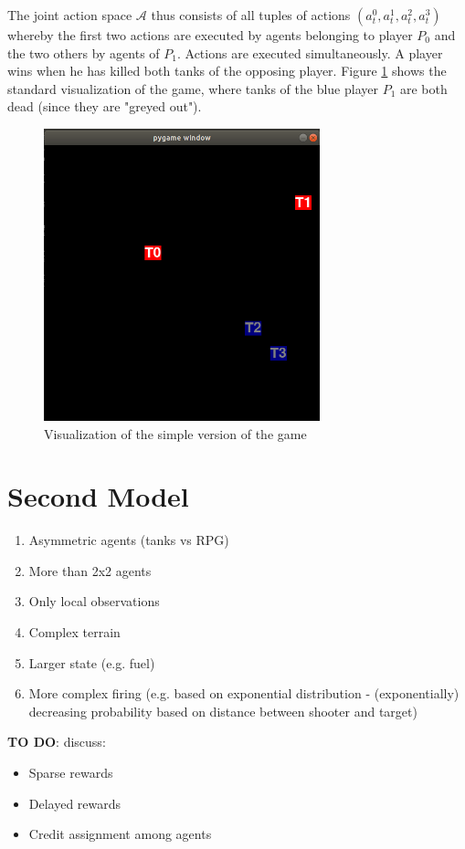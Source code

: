 The joint action space $\mathcal{A}$ thus consists of all tuples of actions $(a_t^0, a_t^1, a_t^2, a_t^3)$ whereby the first two actions are executed by agents belonging to player $P_0$ and the two others by agents of $P_1$. Actions are executed simultaneously. A player wins when he has killed both tanks of the opposing player. Figure \ref{fig:game_visual} shows the standard visualization of the game, where tanks of the blue player $P_1$ are both dead (since they are "greyed out").

\begin{figure}[htp]
    \centering
    \includegraphics[width=8cm]{images/game_visual.png}
    \caption{Visualization of the simple version of the game}
    \label{fig:game_visual}
\end{figure}



\section{Second Model}
\begin{enumerate}
    \item Asymmetric agents (tanks vs RPG)
    \item More than 2x2 agents
    \item Only local observations
    \item Complex terrain
    \item Larger state (e.g. fuel)
    \item More complex firing (e.g. based on exponential distribution - (exponentially) decreasing probability based on distance between shooter and target)
\end{enumerate}

\textbf{TO DO}: discuss:
\begin{itemize}
    \item Sparse rewards
    \item Delayed rewards
    \item Credit assignment among agents
\end{itemize}